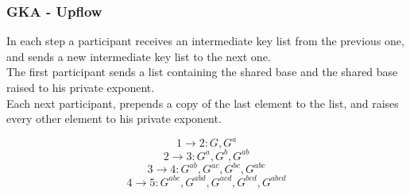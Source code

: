\begin{frame}
  \frametitle{GKA - Upflow}
  In each step a participant receives an intermediate key list from the previous one, and sends a new intermediate key list to the next one.\\[0.3cm]
  
  The first participant sends a list containing the shared base and the shared base raised to his private exponent.\\[0.3cm]
  
  Each next participant, prepends a copy of the last element to the list, and raises every other element to his private exponent.\\[0.3cm]

  \begin{minipage}{.47\textwidth}
    \[ 1 \rightarrow 2: G, G^a \]
    \[ 2 \rightarrow 3: G^a, G^b, G^{ab} \]
    \[ 3 \rightarrow 4: G^{ab}, G^{ac}, G^{bc}, G^{abc} \]
    \[ 4 \rightarrow 5: G^{abc}, G^{abd}, G^{acd}, G^{bcd}, G^{abcd} \]

  \end{minipage}
  
  \begin{minipage}{.47\textwidth}
   \begin{figure}
    \end{figure}
  \end{minipage}
\end{frame}

